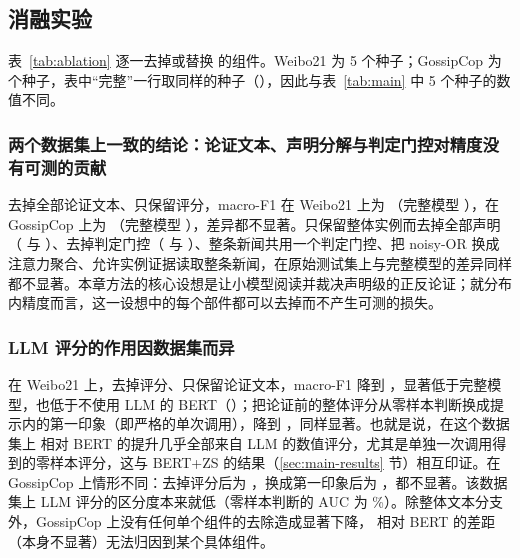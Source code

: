 \subsection{消融实验}\label{sec:exp-ablation}

\begin{table}[htbp]
\centering\footnotesize
\setlength{\tabcolsep}{3.4pt}
\caption{\method{} 的消融实验（macro-F1，\%）}\label{tab:ablation}
\end{table}

表~\ref{tab:ablation} 逐一去掉或替换 \method{} 的组件。Weibo21 为 5 个种子；GossipCop 为  个种子，表中“完整”一行取同样的种子（），因此与表~\ref{tab:main} 中 5 个种子的数值不同。

\subsubsection{两个数据集上一致的结论：论证文本、声明分解与判定门控对精度没有可测的贡献}
去掉全部论证文本、只保留评分，macro-F1 在 Weibo21 上为 （完整模型 ），在 GossipCop 上为 （完整模型 ），差异都不显著。只保留整体实例而去掉全部声明（ 与 ）、去掉判定门控（ 与 ）、整条新闻共用一个判定门控、把 noisy-OR 换成注意力聚合、允许实例证据读取整条新闻，在原始测试集上与完整模型的差异同样都不显著。本章方法的核心设想是让小模型阅读并裁决声明级的正反论证；就分布内精度而言，这一设想中的每个部件都可以去掉而不产生可测的损失。

\subsubsection{LLM 评分的作用因数据集而异}
在 Weibo21 上，去掉评分、只保留论证文本，macro-F1 降到 ，显著低于完整模型，也低于不使用 LLM 的 BERT（）；把论证前的整体评分从零样本判断换成提示内的第一印象（即严格的单次调用），降到 ，同样显著。也就是说，在这个数据集上 \method{} 相对 BERT 的提升几乎全部来自 LLM 的数值评分，尤其是单独一次调用得到的零样本评分，这与 BERT+ZS 的结果（\ref{sec:main-results} 节）相互印证。在 GossipCop 上情形不同：去掉评分后为 ，换成第一印象后为 ，都不显著。该数据集上 LLM 评分的区分度本来就低（零样本判断的 AUC 为 \%）。除整体文本分支外，GossipCop 上没有任何单个组件的去除造成显著下降，\method{} 相对 BERT 的差距（本身不显著）无法归因到某个具体组件。

